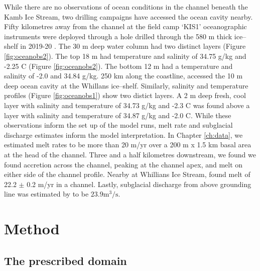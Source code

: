 While there are no observations of ocean conditions in the channel beneath the Kamb Ice Stream, two drilling campaigns have accessed the ocean cavity nearby. 
Fifty kilometres away from the channel at the field camp `KIS1' oceanographic instruments were deployed through a hole drilled through the 580 m thick ice--shelf in 2019-20 \citep{robinson2020ice}. The 30 m deep water column had two distinct layers (Figure \ref{fig:oceanobs2}). The top 18 m had temperature and salinity of 34.75 g/kg and -2.25 \textdegree C (Figure \ref{fig:oceanobs2}). The bottom 12 m had a temperature and salinity of -2.0 and 34.84 g/kg.
250 km along the coastline, \cite{begeman2018ocean} accessed the 10 m deep ocean cavity at the Whillans ice--shelf. Similarly, salinity and temperature profiles (Figure \ref{fig:oceanobs1}) show two distict layers. A 2 m deep fresh, cool layer with salinity and temperature of 34.73 g/kg and -2.3 \textdegree C was found above a layer with salinity and temperature of 34.87 g/kg and -2.0 \textdegree C.
While these observations inform the set up of the model runs, melt rate and subglacial discharge estimates inform the model interpretation.
In Chapter \ref{ch:data}, we estimated melt rates to be more than 20 m/yr over a 200 m x 1.5 km basal area at the head of the channel. Three and a half kilometres downstream, we found we found accretion across the channel, peaking at the channel apex, and melt on either side of the channel profile. Nearby at Whillians Ice Stream, \cite{marsh2016high} found melt of 22.2 $\pm$ 0.2 m/yr in a channel. Lastly, subglacial discharge from above grounding line was estimated by \cite{le2009subglacial} to be $23.9 \mathrm{m}^3/\mathrm{s}$.


\section{Method}

\subsection{The prescribed domain} \label{sec:domain}


